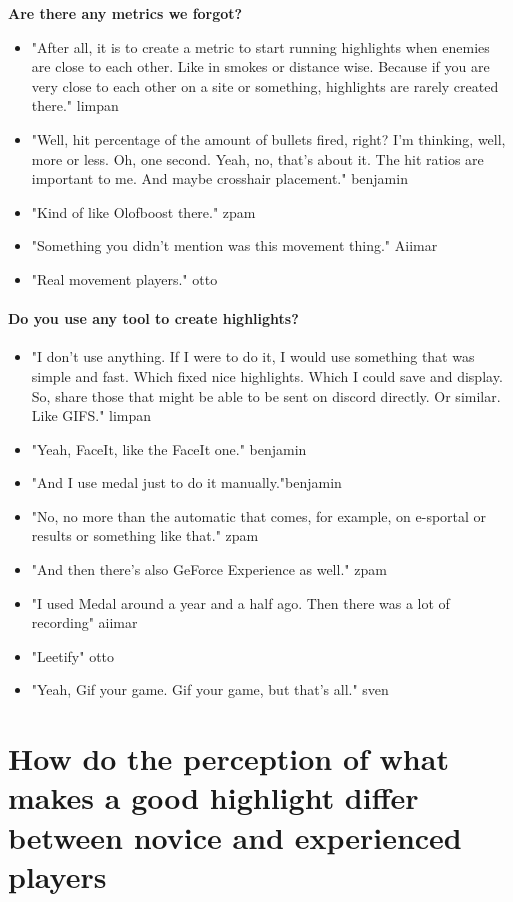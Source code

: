     \textbf{Are there any metrics we forgot?}
    \begin{itemize}
        \item "After all, it is to create a metric to start running highlights when enemies are close to each other. Like in smokes or distance wise. Because if you are very close to each other on a site or something, highlights are rarely created there." {limpan}
        \item "Well, hit percentage of the amount of bullets fired, right? I'm thinking, well, more or less. Oh, one second. Yeah, no, that's about it. The hit ratios are important to me. And maybe crosshair placement." {benjamin}
        \item "Kind of like Olofboost there." {zpam}
        \item "Something you didn't mention was this movement thing." {Aiimar}
        \item "Real movement players." {otto}
    \end{itemize}
\paragraph{Do you use any tool to create highlights?}
\begin{itemize}
    \item "I don't use anything. If I were to do it, I would use something that was simple and fast. Which fixed nice highlights. Which I could save and display. So, share those that might be able to be sent on discord directly. Or similar. Like GIFS." {limpan}
    \item  "Yeah, FaceIt, like the FaceIt one." {benjamin}
    \item "And I use medal just to do it manually."{benjamin}
    \item "No, no more than the automatic that comes, for example, on e-sportal or results or something like that." {zpam}
    \item "And then there's also GeForce Experience as well." {zpam}
    \item "I used Medal around a year and a half ago. Then there was a lot of recording" {aiimar}
    \item "Leetify" {otto} 
    \item "Yeah, Gif your game. Gif your game, but that's all." {sven}
    
\end{itemize}

\section{How do the perception of what makes a good highlight differ between novice and experienced players}


